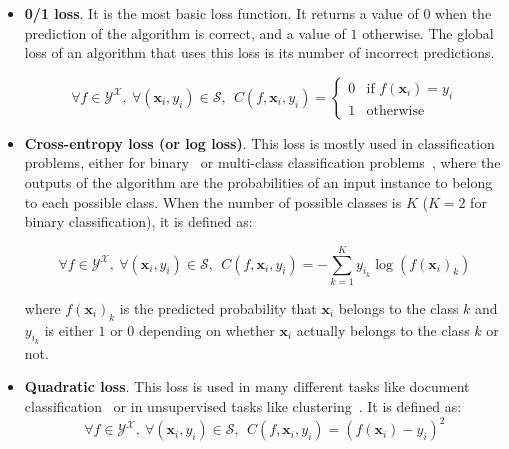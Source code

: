     \begin{itemize}
      \item \textbf{0/1 loss}. It is the most basic loss function. It returns a
        value of $0$ when the prediction of the algorithm is correct, and a
        value of $1$ otherwise. The global loss of an algorithm that uses this
        loss is its number of incorrect predictions.

        \begin{equation}
          \forall f \in \mathcal{Y}^\mathcal{X},~
          \forall (\mathbf{x}_i, y_i) \in \mathcal{S},~~
          C(f, \mathbf{x}_i, y_i) =
            \begin{cases}
              0 & \text{if } f(\mathbf{x}_i) = y_i\\
              1 & \text{otherwise}
            \end{cases}
        \end{equation}

      \item \textbf{Cross-entropy loss (or log loss)}. This loss is mostly used
        in classification problems, either for binary~\citep{nam2014large} or
        multi-class classification problems~\citep{kurata2016improved}, where
        the outputs of the algorithm are the probabilities of an input instance
        to belong to each possible class. When the number of possible classes is
        $K$ ($K=2$ for binary classification), it is defined as:

        \begin{equation}
          \forall f \in \mathcal{Y}^\mathcal{X},~
          \forall (\mathbf{x}_i, y_i) \in \mathcal{S},~~
          C(f, \mathbf{x}_i, y_i) =
          - \sum_{k = 1}^K y_{i_k} \log({f(\mathbf{x}_i)}_k)
        \end{equation}

        where ${f(\mathbf{x}_i)}_k$ is the predicted probability that
        $\mathbf{x}_i$ belongs to the class $k$ and $y_{i_k}$ is either $1$ or
        $0$ depending on whether $\mathbf{x}_i$ actually belongs to the class
        $k$ or not.

      \item \textbf{Quadratic loss}. This loss is used in many different tasks
        like document classification~\citep{lodhi2002boosting} or in
        unsupervised tasks like clustering~\citep{jacob2009clustered}.  It is
        defined as:
        \begin{equation}
          \forall f \in \mathcal{Y}^\mathcal{X},~
          \forall (\mathbf{x}_i, y_i) \in \mathcal{S},~~
          C(f, \mathbf{x}_i, y_i) =
          (f(\mathbf{x}_i) - y_i)^2
        \end{equation}
    \end{itemize}

